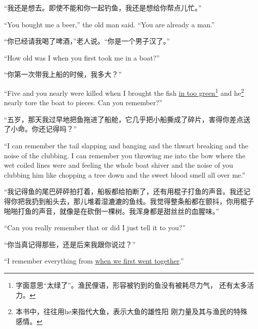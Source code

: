 \begin{paracol}{2}
\switchcolumn

“我还是想去。即使不能和你一起钓鱼，我还是想给你帮点儿忙。”

\switchcolumn*

``You bought me a beer,'' the old man said. ``You are already a man.''

\switchcolumn

“你已经请我喝了啤酒，”老人说。“你是一个男子汉了。”

\switchcolumn*

``How old was I when you first took me in a boat?''

\switchcolumn

“你第一次带我上船的时候，我多大？”

\switchcolumn*

``Five and you nearly were killed when I brought the fish \uline{in too
  green}\footnote{字面意思“太绿了”。渔民俚语，形容被钓到的鱼没有被耗尽力气，
  还有太多活力。} and he\footnote{本书中，往往用he来指代大鱼，表示大鱼的雄性阳
  刚力量及其与渔民的特殊感情。} nearly \gls{tore} the boat to pieces. Can
you remember?''

\switchcolumn

“五岁，那天我过早地把鱼拖进了船舱，它几乎把小船撕成了碎片，害得你差点送了小命。你还记得吗？”

\switchcolumn*

``I can remember the tail \gls{slapping} and \gls{banging} and the \gls{thwart}
breaking and the noise of the \gls{clubbing}. I can remember you throwing me into
the \gls{bow} where the wet coiled lines were and feeling the whole boat \gls{shiver}
and the noise of you \gls{clubbing} him like \gls{chopping} a tree down and the \gls{sweet}
blood smell all \gls{over} me.''

\switchcolumn

“我记得鱼的尾巴砰砰拍打着，船板都给拍断了，还有用棍子打鱼的声音。我还记得你把我扔到船头去，那儿堆着湿漉漉的鱼线。我觉得整条船都在颤抖，你用棍子啪啪打鱼的声音，就像是在砍倒一棵树。我浑身都是甜丝丝的血腥味。”

\switchcolumn*

``Can you really remember that or did I just tell it to you?''

\switchcolumn

“你当真记得那些，还是后来我跟你说过？”

\switchcolumn*

``I remember everything from \uline{when we first went together}.''

\switchcolumn


\end{paracol}
